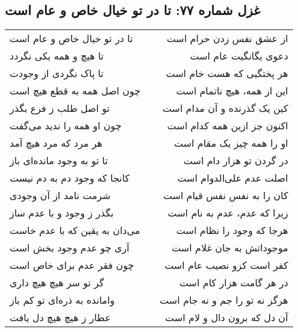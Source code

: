 \begin{center}
\section*{غزل شماره ۷۷: تا در تو خیال خاص و عام است}
\label{sec:077}
\begin{longtable}{l p{0.5cm} r}
تا در تو خیال خاص و عام است
&&
از عشق نفس زدن حرام است
\\
تا هیچ و همه یکی نگردد
&&
دعوی یگانگیت عام است
\\
تا پاک نگردی از وجودت
&&
هر پختگیی که هست خام است
\\
چون اصل همه به قطع هیچ است
&&
این از همه، هیچ ناتمام است
\\
تو اصل طلب ز فرع بگذر
&&
کین یک گذرنده و آن مدام است
\\
چون او همه را ندید می‌گفت
&&
اکنون جز ازین همه کدام است
\\
هر مرد که مرد هیچ آمد
&&
او را همه چیز یک مقام است
\\
تا تو به وجود مانده‌ای باز
&&
در گردن تو هزار دام است
\\
کانجا که وجود دم به دم نیست
&&
اصلت عدم علی‌الدوام است
\\
شرمت نامد از آن وجودی
&&
کان را به نفس نفس قیام است
\\
بگذر ز وجود و با عدم ساز
&&
زیرا که عدم، عدم به نام است
\\
می‌دان به یقین که با عدم خاست
&&
هرجا که وجود را نظام است
\\
آری چو عدم وجود بخش است
&&
موجوداتش به جان غلام است
\\
چون فقر عدم برای خاص است
&&
کفر است کزو نصیب عام است
\\
گر تو سر هیچ هیچ داری
&&
در هر گامت هزار کام است
\\
وامانده به ذره‌ای تو کم باز
&&
هرگز نه تو را جم و نه جام است
\\
عطار ز هیچ هیچ دل یافت
&&
آن دل که برون دال و لام است
\\
\end{longtable}
\end{center}
